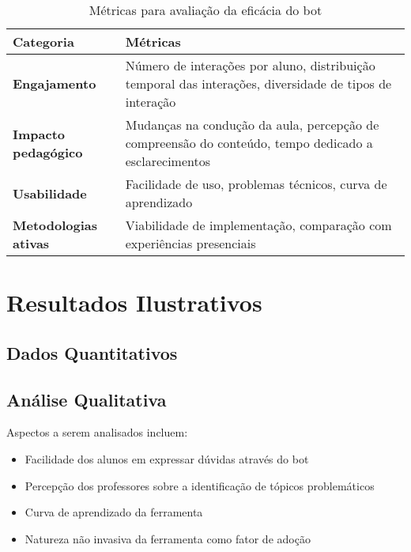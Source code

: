 \begin{table}[htb]
\centering
\caption{Métricas para avaliação da eficácia do bot}
\label{tab:metricas}
\begin{tabular}{|p{3cm}|p{9cm}|}
\hline
\textbf{Categoria} & \textbf{Métricas} \\
\hline
\textbf{Engajamento} & Número de interações por aluno, distribuição temporal das interações, diversidade de tipos de interação \\
\hline
\textbf{Impacto pedagógico} & Mudanças na condução da aula, percepção de compreensão do conteúdo, tempo dedicado a esclarecimentos \\
\hline
\textbf{Usabilidade} & Facilidade de uso, problemas técnicos, curva de aprendizado \\
\hline
\textbf{Metodologias ativas} & Viabilidade de implementação, comparação com experiências presenciais \\
\hline
\end{tabular}
\end{table}


\section{Resultados Ilustrativos}
\label{sec:resultados}


\subsection{Dados Quantitativos}
\label{subsec:dados-quant}


\subsection{Análise Qualitativa}
\label{subsec:analise-qual}

Aspectos a serem analisados incluem:

\begin{itemize}
\item Facilidade dos alunos em expressar dúvidas através do bot
\item Percepção dos professores sobre a identificação de tópicos problemáticos
\item Curva de aprendizado da ferramenta
\item Natureza não invasiva da ferramenta como fator de adoção
\end{itemize}
